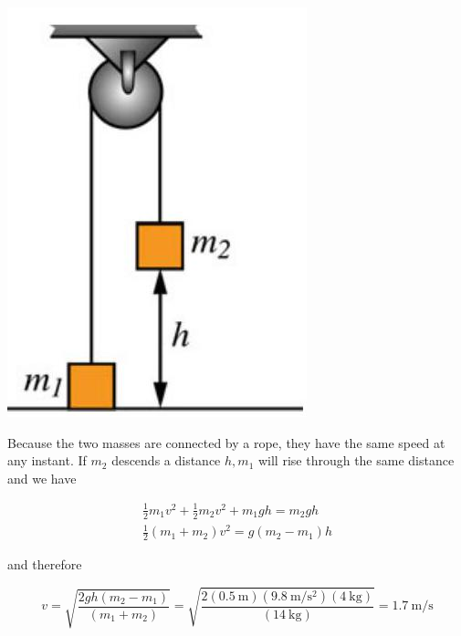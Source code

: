 \documentclass[10pt]{article}
\begin{document}
\begin{center}
\includegraphics[max width=\textwidth]{2024_09_13_db1f357d2aad0a03eb2eg-074}
\end{center}

Because the two masses are connected by a rope, they have the same speed at any instant. If $m_{2}$ descends a distance $h, m_{1}$ will rise through the same distance and we have

$$
\begin{gathered}
\frac{1}{2} m_{1} v^{2}+\frac{1}{2} m_{2} v^{2}+m_{1} g h=m_{2} g h \\
\frac{1}{2}\left(m_{1}+m_{2}\right) v^{2}=g\left(m_{2}-m_{1}\right) h
\end{gathered}
$$

and therefore

$$
v=\sqrt{\frac{2 g h\left(m_{2}-m_{1}\right)}{\left(m_{1}+m_{2}\right)}}=\sqrt{\frac{2(0.5 \mathrm{~m})\left(9.8 \mathrm{~m} / \mathrm{s}^{2}\right)(4 \mathrm{~kg})}{(14 \mathrm{~kg})}}=1.7 \mathrm{~m} / \mathrm{s}
$$
\end{document}
